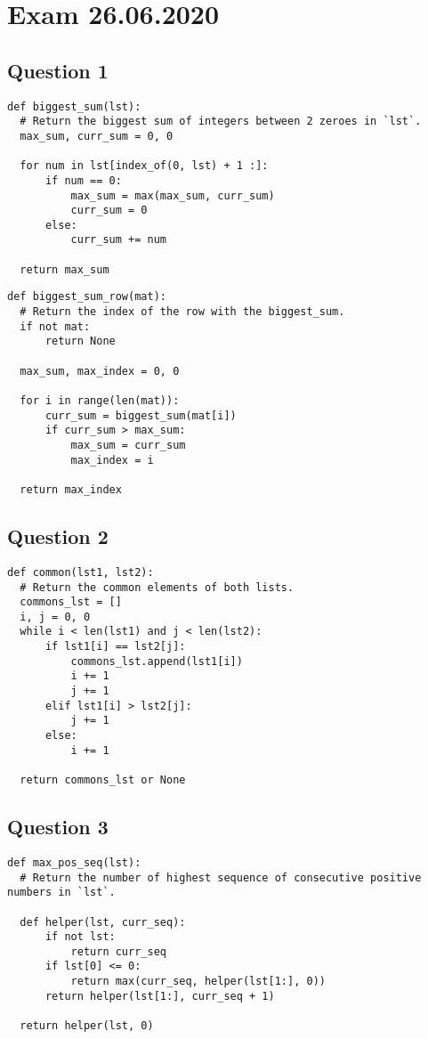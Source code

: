 \documentclass[11pt]{article}
\begin{document}
\restoregeometry{}

\section{Exam 26.06.2020}

\subsection{Question 1}
\begin{lstlisting}
def biggest_sum(lst):
  # Return the biggest sum of integers between 2 zeroes in `lst`.
  max_sum, curr_sum = 0, 0

  for num in lst[index_of(0, lst) + 1 :]:
      if num == 0:
          max_sum = max(max_sum, curr_sum)
          curr_sum = 0
      else:
          curr_sum += num

  return max_sum
\end{lstlisting}

\begin{lstlisting}
def biggest_sum_row(mat):
  # Return the index of the row with the biggest_sum.
  if not mat:
      return None

  max_sum, max_index = 0, 0

  for i in range(len(mat)):
      curr_sum = biggest_sum(mat[i])
      if curr_sum > max_sum:
          max_sum = curr_sum
          max_index = i

  return max_index
\end{lstlisting}

\subsection{Question 2}
\begin{lstlisting}
def common(lst1, lst2):
  # Return the common elements of both lists.
  commons_lst = []
  i, j = 0, 0
  while i < len(lst1) and j < len(lst2):
      if lst1[i] == lst2[j]:
          commons_lst.append(lst1[i])
          i += 1
          j += 1
      elif lst1[i] > lst2[j]:
          j += 1
      else:
          i += 1

  return commons_lst or None
\end{lstlisting}

\subsection{Question 3}
\begin{lstlisting}
def max_pos_seq(lst):
  # Return the number of highest sequence of consecutive positive numbers in `lst`.

  def helper(lst, curr_seq):
      if not lst:
          return curr_seq
      if lst[0] <= 0:
          return max(curr_seq, helper(lst[1:], 0))
      return helper(lst[1:], curr_seq + 1)

  return helper(lst, 0)
\end{lstlisting}
\end{document}
